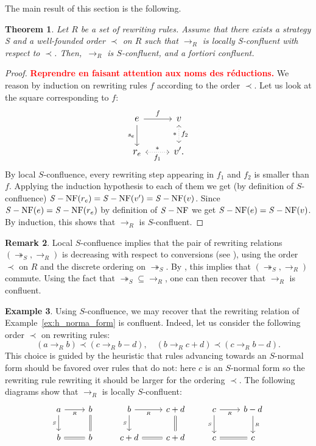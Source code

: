 \documentclass[10pt]{easychair}
\newtheorem{theorem}{Theorem}[section]
\theoremstyle{definition}
\newtheorem{remark}[theorem]{Remark}
\newtheorem{example}[theorem]{Example}
\newcommand\todo[1]{{\bf\textcolor{red}{#1}}}
\newcommand\rewR{\to_R}
\newcommand\rewS{\twoheadrightarrow_S}
\DeclareMathOperator{\NF}{{\it S}-NF}
\begin{document}
The main result of this section is the following.
\medskip

\begin{theorem}\label{thm:confluence_criterion}
  Let $R$ be a set of rewriting rules. Assume that there exists a
  strategy S and a well-founded order $\prec$ on $R$ such that $\rewR$ is
  locally S-confluent with respect to $\prec$. Then,~$\rewR$ is
  $S$-confluent, and \emph{a fortiori} confluent. 
\end{theorem}

\begin{proof}
  \todo{Reprendre en faisant attention aux noms des réductions.}
  We reason by induction on rewriting rules $f$ according to the order
  $\prec$. Let us look at the square corresponding to $f$:
  \[\large\begin{tikzcd}
  e\ar[r, "f"]\ar[d, "s_e"'] & v\ar[d, leftrightarrow, dotted, "*"', "f_2"]\\
  r_e\ar[r, leftrightarrow, dotted, "*", "f_1"'] & v'.
  \end{tikzcd}\]
  By local $S$-confluence, every rewriting step appearing
  in $f_1$ and $f_2$ is smaller than $f$.
  Applying the induction hypothesis to each of them we get
  (by definition of $S$-confluence) $\NF(r_e) = \NF(v') = \NF(v)$.
  Since $\NF(e) = \NF(r_e)$ by definition of $\NF$ we get $\NF(e) = \NF(v)$.
  By induction, this shows that $\rewR$ is $S$-confluent.
\end{proof}
\medskip

\begin{remark}
  Local $S$-confluence implies that the pair of rewriting relations
  $(\rewS,\rewR)$ is decreasing with respect to conversions (see
  \cite[Definition 3]{van2008confluence}), using the order $\prec$ on $R$
  and the discrete ordering on $\rewS$. By
  \cite[Theorem 3]{van2008confluence}, this implies that $(\rewS,\rewR)$
  commute. Using the fact that $\rewS \subseteq \rewR$, one can then
  recover that $\rewR$ is confluent.
\end{remark}
\smallskip

\begin{example}\label{ex:end_to_example}
  Using $S$-confluence, we may recover that the rewriting relation of
  Example~\ref{ex:h_norma_form} is confluent. Indeed, let us consider the
  following order $\prec$ on rewriting rules:
  \[(a\rewR b)\prec(c\rewR b-d),\quad(b\rewR c+d)\prec(c\rewR b-d).\]
  This choice is guided by the heuristic that rules advancing towards an
  $S$-normal form should be favored over rules that do not: here $c$ is
  an $S$-normal form so the rewriting rule rewriting it should be larger
  for the ordering $\prec$.
  The following diagrams show that $\rewR$ is locally $S$-confluent:
  \[\begin{tikzcd}
  a\ar[r, "_R"']\ar[d, "_S"'] & b\ar[d, equal] & b\ar[r, "_R"']
  \ar[d, "_S"'] & c+d\ar[d, equal] & c\ar[r, "_R"']\ar[d,
    "_S"'] & b-d\ar[d, "_R"]\\
  b\ar[r, equal] & b & c+d\ar[r, equal] & c+d & c\ar[r, equal] & c
  \end{tikzcd}\]
\end{example}
\smallskip
\end{document}
